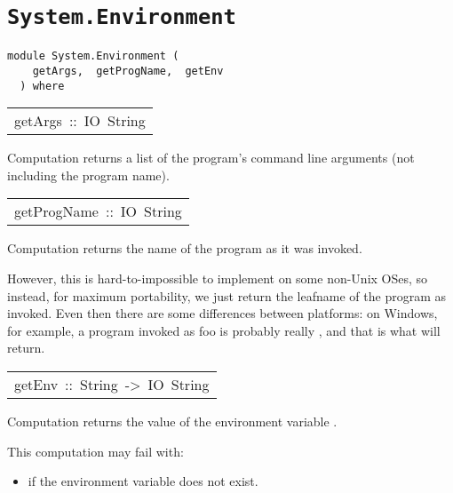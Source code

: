 \chapter{\texttt{System.Environment}}
\label{module:System.Environment}
\haddockbeginheader
{\haddockverb\begin{verbatim}
module System.Environment (
    getArgs,  getProgName,  getEnv
  ) where\end{verbatim}}
\haddockendheader

\begin{haddockdesc}
\item[\begin{tabular}{@{}l}
getArgs\ ::\ IO\ {\char 91}String{\char 93}
\end{tabular}]\haddockbegindoc
Computation  returns a list of the program's command
 line arguments (not including the program name).
\par

\end{haddockdesc}
\begin{haddockdesc}
\item[\begin{tabular}{@{}l}
getProgName\ ::\ IO\ String
\end{tabular}]\haddockbegindoc
Computation  returns the name of the program as it was
invoked.
\par
However, this is hard-to-impossible to implement on some non-Unix
OSes, so instead, for maximum portability, we just return the leafname
of the program as invoked. Even then there are some differences
between platforms: on Windows, for example, a program invoked as foo
is probably really , and that is what  will return.
\par

\end{haddockdesc}
\begin{haddockdesc}
\item[\begin{tabular}{@{}l}
getEnv\ ::\ String\ ->\ IO\ String
\end{tabular}]\haddockbegindoc
Computation   returns the value
 of the environment variable .  
\par
This computation may fail with:
\par
\begin{itemize}
\item
  if the environment variable
    does not exist.
\par

\end{itemize}

\end{haddockdesc}